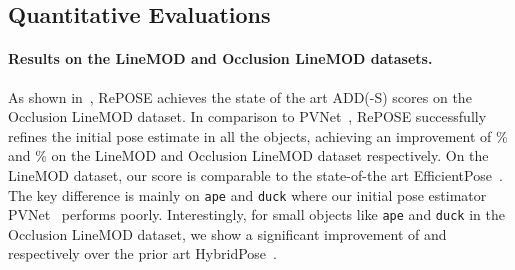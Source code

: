 \documentclass[10pt,twocolumn,letterpaper]{article}
\begin{document}
\begin{table}[t]
\small
\centering
\caption{Comparison of RePOSE on Occlusion LineMOD dataset with recent methods including PVNet~\cite{peng2019pvnet}, DPOD~\cite{Zakharov_2019_ICCV}, and HybridPose~\cite{Song_2020_CVPR} using the ADD(-S) score. Note, we exclude EfficientPose~\cite{bukschat2020efficientpose} as it is trained on the Occlusion LineMOD dataset. \# of wins denotes in how many objects the method achieves the best score.}
\label{tab:result_of_occlusion_linemod}
\end{table}

\subsection{Quantitative Evaluations}

\paragraph{Results on the LineMOD and Occlusion LineMOD datasets.}
As shown in~, RePOSE achieves the state of the art ADD(-S) scores on the Occlusion LineMOD dataset. In comparison to PVNet~\cite{peng2019pvnet}, RePOSE successfully refines the initial pose estimate in all the objects, achieving an improvement of \% and \% on the LineMOD and Occlusion LineMOD dataset respectively. On the LineMOD dataset, our score is comparable to the state-of-the art EfficientPose~\cite{bukschat2020efficientpose}. The key difference is mainly on \texttt{ape} and \texttt{duck} where our initial pose estimator PVNet~\cite{peng2019pvnet} performs poorly. Interestingly, for small objects like \texttt{ape} and \texttt{duck} in the Occlusion LineMOD dataset, we show a significant improvement of  and  respectively over the prior art HybridPose~\cite{Song_2020_CVPR}.
\end{document}
